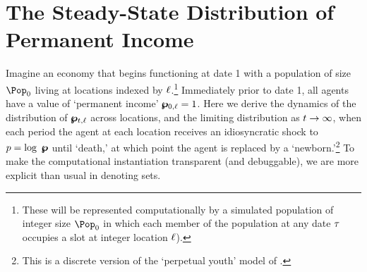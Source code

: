 \documentclass[../BufferStockTheory.tex]{subfiles}\usepackage{ApndxSteadyState}
\begin{document}
  \section{The Steady-State Distribution of Permanent Income}
  \Biggen
  Imagine an economy that begins functioning at date 1 with a population of size $\Pop_{0}$ living at locations indexed by  $\ell$.\footnote{These will be represented computationally by a simulated population of integer size $\Pop_{0}$ in which each member of the population at any date $\tau$ occupies a slot at integer location $\ell$).}  Immediately prior to date 1, all agents have a value of `permanent income' $\pmb{\wp}_{0,\ell}=1$. 
  Here we derive the dynamics of the distribution of $\pmb{\wp}_{t,\ell}$ across locations, and the limiting distribution as $t \rightarrow \infty$, when each period the agent at each location receives an idiosyncratic shock to $p = \log ~ \pmb{\wp}$ until `death,' at which point the agent is replaced by a `newborn.'\footnote{This is a discrete version of the `perpetual youth' model of  \cite{blanchardFinite}.} To make the computational instantiation transparent (and debuggable), we are more explicit than usual in denoting sets.
\end{document}
